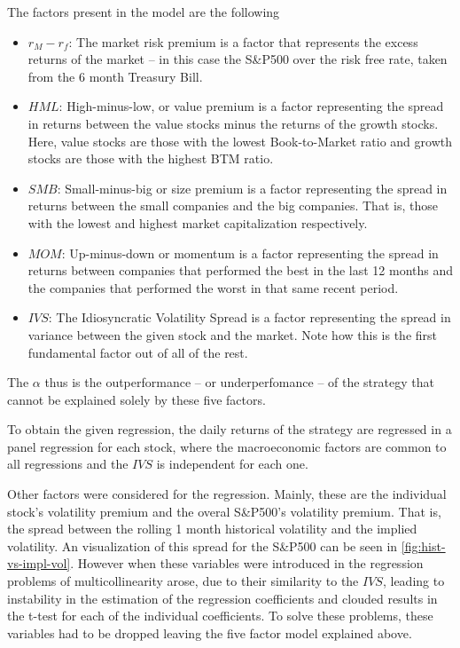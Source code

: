 The factors present in the model are the following 
\begin{itemize}
    \item $r_M-r_f$: The market risk premium is a factor that represents the excess returns of the market -- in this case the S\&P500 over the risk free rate, taken from the 6 month Treasury Bill. 
    \item $HML$: High-minus-low, or value premium is a factor representing the spread in returns between the value stocks minus the returns of the growth stocks. Here, value stocks are those with the lowest Book-to-Market ratio and growth stocks are those with the highest BTM ratio.
    \item $SMB$: Small-minus-big or size premium is a factor representing the spread in returns between the small companies and the big companies. That is, those with the lowest and highest market capitalization respectively.
    \item $MOM$: Up-minus-down or momentum is a factor representing the spread in returns between companies that performed the best in the last 12 months and the companies that performed the worst in that same recent period. 
    \item $IVS$: The Idiosyncratic Volatility Spread is a factor representing the spread in variance between the given stock and the market. Note how this is the first fundamental factor out of all of the rest.
\end{itemize}

The $\alpha$ thus is the outperformance -- or underperfomance -- of the strategy that cannot be explained solely by these five factors. 

To obtain the given regression, the daily returns of the strategy are regressed in a panel regression for each stock, where the macroeconomic factors are common to all regressions and the $IVS$ is independent for each one. 

Other factors were considered for the regression. Mainly, these are the individual stock's volatility premium and the overal S\&P500's volatility premium. That is, the spread between the rolling 1 month historical volatility and the implied volatility. An visualization of this spread for the S\&P500 can be seen in \autoref{fig:hist-vs-impl-vol}. However when these variables were introduced in the regression problems of multicollinearity arose, due to their similarity to the $IVS$, leading to instability in the estimation of the regression coefficients and clouded results in the t-test for each of the individual coefficients. To solve these problems, these variables had to be dropped leaving the five factor model explained above.

